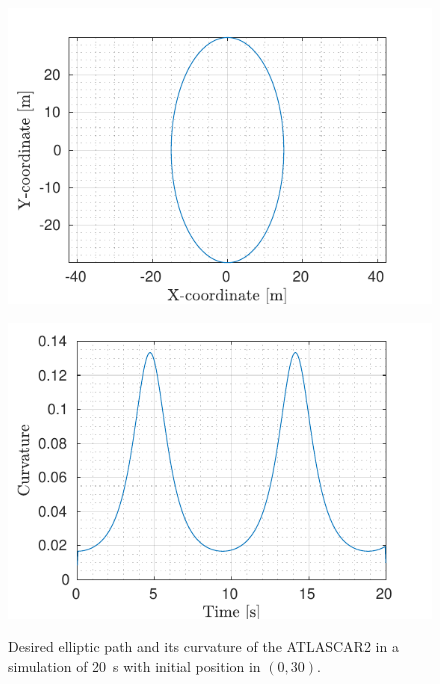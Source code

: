 \begin{figure}[!t]
	\begin{minipage}[t]{0.5\textwidth}
		\includegraphics[width=\textwidth]{../../MATLAB/lane_following_circular_path/figure/Reference_circular.pdf}
		\subcaption{}
		\label{fig:reference_laneFollowing_circular}
	\end{minipage}
	\begin{minipage}[t]{0.5\textwidth}
		\includegraphics[width=\textwidth]{../../MATLAB/lane_following_circular_path/figure/Curvature_circular.pdf}
		\subcaption{}
		\label{fig:curvature_laneFollowing_circular}
	\end{minipage}
	\caption{Desired elliptic path and its curvature of the ATLASCAR2 in a simulation of \SI{20}{s} with initial position in $(0,30)$.}
	\label{fig:laneFollowing_desired_circular}
\end{figure}

